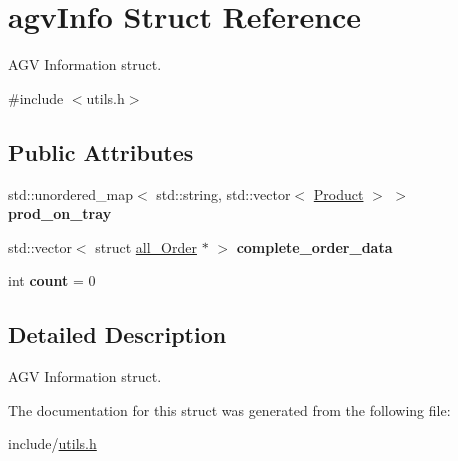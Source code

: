 \hypertarget{structagvInfo}{}\section{agv\+Info Struct Reference}
\label{structagvInfo}


A\+GV Information struct.  




{\ttfamily \#include $<$utils.\+h$>$}

\subsection*{Public Attributes}
\begin{DoxyCompactItemize}
\item 
\mbox{\label{structagvInfo_a54c7918b537ffca61497ffcb0cd93180}} 
std\+::unordered\+\_\+map$<$ std\+::string, std\+::vector$<$ \hyperlink{structProduct}{Product} $>$ $>$ {\bfseries prod\+\_\+on\+\_\+tray}
\item 
\mbox{\label{structagvInfo_abfeb16cd018edba83deb548706f9d18e}} 
std\+::vector$<$ struct \hyperlink{structall__Order}{all\+\_\+\+Order} $\ast$ $>$ {\bfseries complete\+\_\+order\+\_\+data}
\item 
\mbox{\label{structagvInfo_a98e263e9827fad038ca72e64fe959c63}} 
int {\bfseries count} = 0
\end{DoxyCompactItemize}


\subsection{Detailed Description}
A\+GV Information struct. 

The documentation for this struct was generated from the following file\+:\begin{DoxyCompactItemize}
\item 
include/\hyperlink{utils_8h}{utils.\+h}\end{DoxyCompactItemize}
